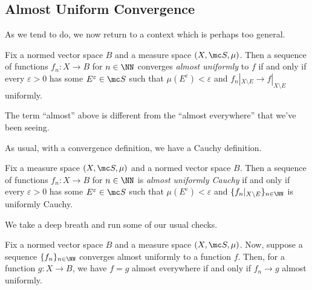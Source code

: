 \documentclass[../notes.tex]{subfiles}
\begin{document}
\subsection{Almost Uniform Convergence}
As we tend to do, we now return to a context which is perhaps too general.
\begin{definition}
	Fix a normed vector space $B$ and a measure space $(X,\mc S,\mu)$. Then a sequence of functions $f_n\colon X\to B$ for $n\in\NN$ converges \textit{almost uniformly} to $f$ if and only if every $\varepsilon>0$ has some $E^\varepsilon\in\mc S$ such that $\mu(E^\varepsilon)<\varepsilon$ and $f_n|_{X\setminus E}\to f|_{X\setminus E}$ uniformly.
\end{definition}
\begin{remark}
	The term ``almost'' above is different from the ``almost everywhere'' that we've been seeing.
\end{remark}
As usual, with a convergence definition, we have a Cauchy definition.
\begin{definition}
	Fix a measure space $(X,\mc S,\mu)$ and a normed vector space $B$. Then a sequence of functions $f_n\colon X\to B$ for $n\in\NN$ is \textit{almost uniformly Cauchy} if and only if every $\varepsilon>0$ has some $E^\varepsilon\in\mc S$ such that $\mu(E^\varepsilon)<\varepsilon$ and $\{f_n|_{X\setminus E}\}_{n\in\NN}$ is uniformly Cauchy.
\end{definition}
We take a deep breath and run some of our usual checks.
\begin{lemma} \label{lem:uniq-almost-uniform-limit}
	Fix a normed vector space $B$ and a measure space $(X,\mc S,\mu)$. Now, suppose a sequence $\{f_n\}_{n\in\NN}$ converges almost uniformly to a function $f$. Then, for a function $g\colon X\to B$, we have $f=g$ almost everywhere if and only if $f_n\to g$ almost uniformly.
\end{lemma}
\end{document}
